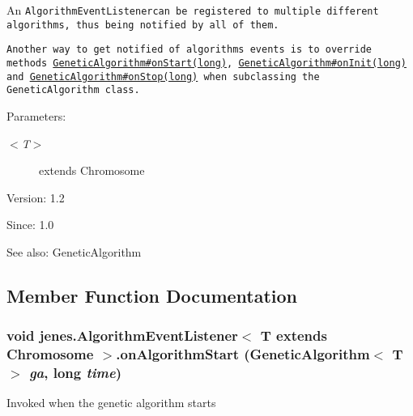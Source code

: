 An {\tt AlgorithmEventListener{\tt  can be registered to multiple different algorithms, thus being notified by all of them. }}

{\tt {\tt  Another way to get notified of algorithms events is to override methods \hyperlink{}{GeneticAlgorithm\#onStart(long)}, \hyperlink{}{GeneticAlgorithm\#onInit(long)} and \hyperlink{}{GeneticAlgorithm\#onStop(long)} when subclassing the {\tt GeneticAlgorithm} class. }}

{\tt {\tt  \begin{Desc}
\item[Parameters:]
\begin{description}
\item[{\em $<$T$>$}]extends Chromosome\end{description}
\end{Desc}
\begin{Desc}
\item[Version:]1.2 \end{Desc}
\begin{Desc}
\item[Since:]1.0\end{Desc}
\begin{Desc}
\item[See also:]GeneticAlgorithm \end{Desc}
}}

\subsection{Member Function Documentation}
\hypertarget{interfacejenes_1_1_algorithm_event_listener_3_01_t_01extends_01_chromosome_01_4_f0d6e9961e685f4d44270a4feedeb70f}{
\subsubsection[onAlgorithmStart]{\setlength{\rightskip}{0pt plus 5cm}void jenes.AlgorithmEventListener$<$ T extends Chromosome $>$.onAlgorithmStart (GeneticAlgorithm$<$ T $>$ {\em ga}, \/  long {\em time})}}
\label{interfacejenes_1_1_algorithm_event_listener_3_01_t_01extends_01_chromosome_01_4_f0d6e9961e685f4d44270a4feedeb70f}


Invoked when the genetic algorithm starts

